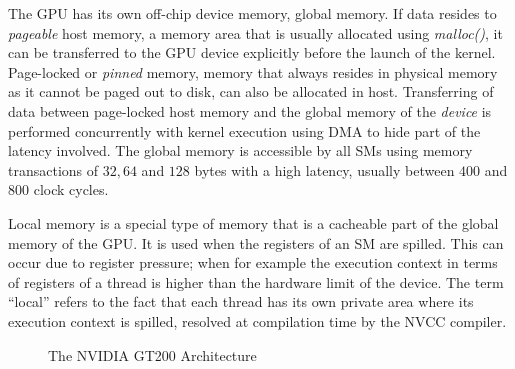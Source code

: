 \documentclass{ws-ijait}
\begin{document}
The GPU has its own off-chip device memory, global memory. If data resides to \textit{pageable} host memory, a memory area that is usually allocated using \textit{malloc()}, it can be transferred to the GPU device explicitly before the launch of the kernel. Page-locked or \textit{pinned} memory, memory that always resides in physical memory as it cannot be paged out to disk, can also be allocated in host. Transferring of data between page-locked host memory and the global memory of the \textit{device} is performed concurrently with kernel execution using DMA to hide part of the latency involved. The global memory is accessible by all SMs using memory transactions of $32, 64$ and $128$ bytes with a high latency, usually between $400$ and $800$ clock cycles.

Local memory is a special type of memory that is a cacheable part of the global memory of the GPU. It is used when the registers of an SM are spilled. This can occur due to register pressure; when for example the execution context in terms of registers of a thread is higher than the hardware limit of the device. The term ``local'' refers to the fact that each thread has its own private area where its execution context is spilled, resolved at compilation time by the NVCC compiler.

\begin{figure}[h]
\centering
{}
  \caption{The NVIDIA GT200 Architecture}
  \label{fig:GT240}
\end{figure}
\end{document}
